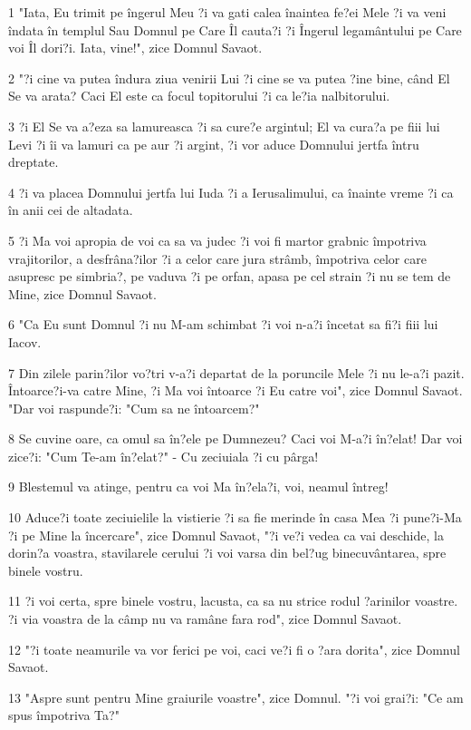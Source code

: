 \par 1 "Iata, Eu trimit pe îngerul Meu ?i va gati calea înaintea fe?ei Mele ?i va veni îndata în templul Sau Domnul pe Care Îl cauta?i ?i Îngerul legamântului pe Care voi Îl dori?i. Iata, vine!", zice Domnul Savaot.
\par 2 "?i cine va putea îndura ziua venirii Lui ?i cine se va putea ?ine bine, când El Se va arata? Caci El este ca focul topitorului ?i ca le?ia nalbitorului.
\par 3 ?i El Se va a?eza sa lamureasca ?i sa cure?e argintul; El va cura?a pe fiii lui Levi ?i îi va lamuri ca pe aur ?i argint, ?i vor aduce Domnului jertfa întru dreptate.
\par 4 ?i va placea Domnului jertfa lui Iuda ?i a Ierusalimului, ca înainte vreme ?i ca în anii cei de altadata.
\par 5 ?i Ma voi apropia de voi ca sa va judec ?i voi fi martor grabnic împotriva vrajitorilor, a desfrâna?ilor ?i a celor care jura strâmb, împotriva celor care asupresc pe simbria?, pe vaduva ?i pe orfan, apasa pe cel strain ?i nu se tem de Mine, zice Domnul Savaot.
\par 6 "Ca Eu sunt Domnul ?i nu M-am schimbat ?i voi n-a?i încetat sa fi?i fiii lui Iacov.
\par 7 Din zilele parin?ilor vo?tri v-a?i departat de la poruncile Mele ?i nu le-a?i pazit. Întoarce?i-va catre Mine, ?i Ma voi întoarce ?i Eu catre voi", zice Domnul Savaot. "Dar voi raspunde?i: "Cum sa ne întoarcem?"
\par 8 Se cuvine oare, ca omul sa în?ele pe Dumnezeu? Caci voi M-a?i în?elat! Dar voi zice?i: "Cum Te-am în?elat?" - Cu zeciuiala ?i cu pârga!
\par 9 Blestemul va atinge, pentru ca voi Ma în?ela?i, voi, neamul întreg!
\par 10 Aduce?i toate zeciuielile la vistierie ?i sa fie merinde în casa Mea ?i pune?i-Ma ?i pe Mine la încercare", zice Domnul Savaot, "?i ve?i vedea ca vai deschide, la dorin?a voastra, stavilarele cerului ?i voi varsa din bel?ug binecuvântarea, spre binele vostru.
\par 11 ?i voi certa, spre binele vostru, lacusta, ca sa nu strice rodul ?arinilor voastre. ?i via voastra de la câmp nu va ramâne fara rod", zice Domnul Savaot.
\par 12 "?i toate neamurile va vor ferici pe voi, caci ve?i fi o ?ara dorita", zice Domnul Savaot.
\par 13 "Aspre sunt pentru Mine graiurile voastre", zice Domnul. "?i voi grai?i: "Ce am spus împotriva Ta?"
